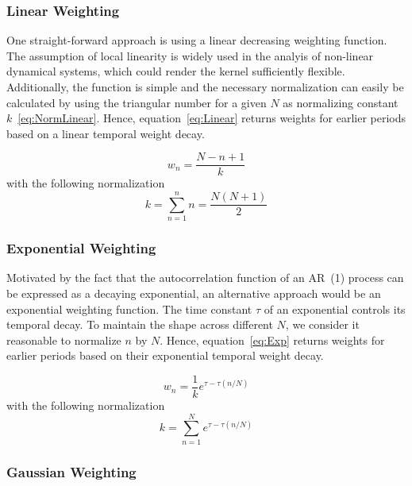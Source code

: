 \documentclass[a4paper]{article}
\begin{document}
\subsubsection{Linear Weighting}

One straight-forward approach is using a linear decreasing weighting function. The assumption of local linearity is widely used in the analyis of non-linear dynamical systems, which could render the kernel sufficiently flexible.
Additionally, the function is simple and the necessary normalization can easily be calculated by using the triangular number for a given $N$ as normalizing constant $k$~\eqref{eq:NormLinear}.
Hence, equation~\eqref{eq:Linear} returns weights for earlier periods based on a linear temporal weight decay.

\begin{equation}
    w_n = \frac{N-n+1}{k}\label{eq:Linear}
\end{equation}
with the following normalization
\begin{equation}
    k  = \sum_{n=1}^{n} n = \frac{N(N+1)}{2}\label{eq:NormLinear}
\end{equation}

\subsubsection{Exponential Weighting}

Motivated by the fact that the autocorrelation function of an AR~(1) process can be expressed as a decaying exponential, an alternative approach would be an exponential weighting function. The time constant $\tau$ of an exponential controls its temporal decay. To maintain the shape across different $N$, we consider it reasonable to normalize $n$ by $N$. Hence, equation~\eqref{eq:Exp} returns weights for earlier periods based on their exponential temporal weight decay.

\begin{equation}
    w_n = \frac{1}{k} e^{\tau-\tau{(n/N)}}\label{eq:Exp}
\end{equation}
with the following normalization
\begin{equation}
    k  = \sum_{n=1}^{N} e^{\tau-\tau{(n/N)}}\label{eq:NormExp}
\end{equation}

\subsubsection{Gaussian Weighting}
\end{document}
